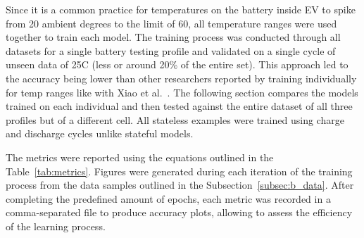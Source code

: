 \begin{table}[htbp]
  \renewcommand{\arraystretch}{1.3}
  \caption{Hyper-params selection - Sorted by lightest}
  \centering
  \label{tab:param-search2}
\end{table}
Since it is a common practice for temperatures on the battery inside EV to spike from 20 ambient degrees to the limit of 60, all temperature ranges were used together to train each model.
The training process was conducted through all datasets for a single battery testing profile and validated on a single cycle of unseen data of 25\textdegree{}C (less or around 20\% of the entire set).
This approach led to the accuracy being lower than other researchers reported by training individually for temp ranges like with Xiao et al.~\cite{xiao_accurate_2019}.
The following section compares the models trained on each individual and then tested against the entire dataset of all three profiles but of a different cell.
All stateless examples were trained using charge and discharge cycles unlike stateful models.

%
%
The metrics were reported using the equations outlined in the \mbox{Table~\ref{tab:metrics}}.
Figures were generated during each iteration of the training process from the data samples outlined in the \mbox{Subsection~\ref{subsec:b_data}}.
After completing the predefined amount of epochs, each metric was recorded in a comma-separated file to produce accuracy plots, allowing to assess the efficiency of the learning process.

